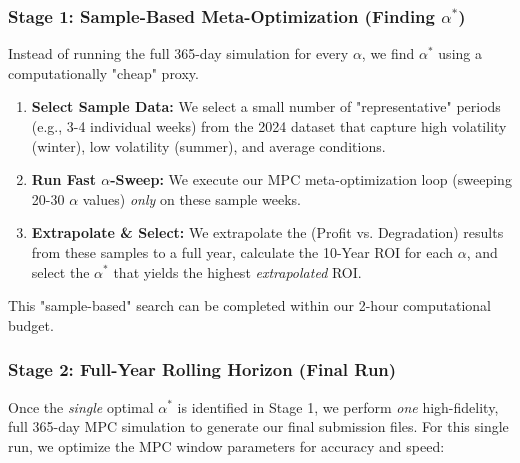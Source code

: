 \documentclass[11pt, a4paper]{article}
\begin{document}
\subsubsection{Stage 1: Sample-Based Meta-Optimization (Finding $\alpha^*$)}
Instead of running the full 365-day simulation for every $\alpha$, we find $\alpha^*$ using a computationally "cheap" proxy.
\begin{enumerate}
    \item \textbf{Select Sample Data:} We select a small number of "representative" periods (e.g., 3-4 individual weeks) from the 2024 dataset that capture high volatility (winter), low volatility (summer), and average conditions.
    \item \textbf{Run Fast $\alpha$-Sweep:} We execute our MPC meta-optimization loop (sweeping 20-30 $\alpha$ values) \emph{only} on these sample weeks.
    \item \textbf{Extrapolate \& Select:} We extrapolate the (Profit vs. Degradation) results from these samples to a full year, calculate the 10-Year ROI for each $\alpha$, and select the $\alpha^*$ that yields the highest \emph{extrapolated} ROI.
\end{enumerate}
This "sample-based" search can be completed within our 2-hour computational budget.

\subsubsection{Stage 2: Full-Year Rolling Horizon (Final Run)}
Once the \emph{single} optimal $\alpha^*$ is identified in Stage 1, we perform \emph{one} high-fidelity, full 365-day MPC simulation to generate our final submission files. For this single run, we optimize the MPC window parameters for accuracy and speed:
\end{document}
